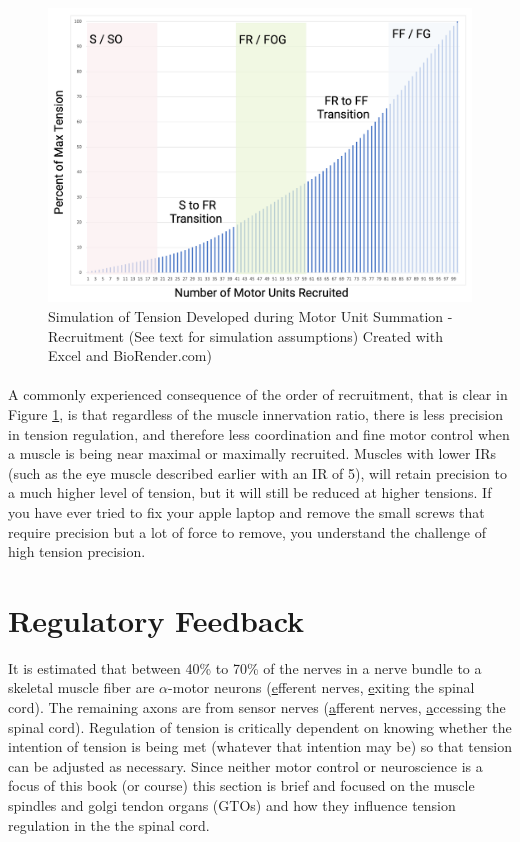 \begin{figure}[!ht]
    \centering
    \includegraphics[width=1\linewidth]{./figure/n_motor_unit_recruitment.png}
    \caption{Simulation of Tension Developed during Motor Unit Summation - Recruitment (See text for simulation assumptions) \footnotesize{Created with Excel and BioRender.com})}
    \label{fig:n_motor_unit_recruitment}
\end{figure}

\paragraph{}

A commonly experienced consequence of the order of recruitment, that is clear in Figure \ref{fig:n_motor_unit_recruitment}, is that regardless of the muscle innervation ratio, there is less precision in tension regulation, and therefore less coordination and fine motor control when a muscle is being near maximal or maximally recruited. Muscles with lower IRs (such as the eye muscle described earlier with an IR of 5), will retain precision to a much higher level of tension, but it will still be reduced at higher tensions. If you have ever tried to fix your apple laptop and remove the small screws that require precision but a lot of force to remove, you understand the challenge of high tension precision.

\section{Regulatory Feedback}

It is estimated that between 40\% to 70\% of the nerves in a nerve bundle to a skeletal muscle fiber are $\alpha$-motor neurons (\underline{e}fferent nerves, \underline{e}xiting the spinal cord). The remaining axons are from sensor nerves (\underline{a}fferent nerves, \underline{a}ccessing the spinal cord). Regulation of tension is critically dependent on knowing whether the intention of tension is being met (whatever that intention may be) so that tension can be adjusted as necessary. Since neither motor control or neuroscience is a focus of this book (or course) this section is brief and focused on the muscle spindles and golgi tendon organs (GTOs) and how they influence tension regulation in the the spinal cord. 

